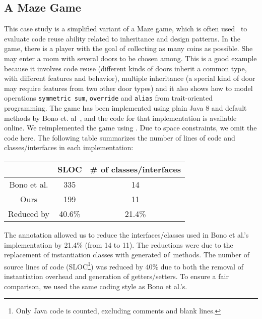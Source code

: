 
\subsection{A Maze Game}
This case study is a simplified variant of a Maze game, which is often
used~\cite{gof,bono14}
to evaluate code reuse ability related to inheritance and design
patterns. In the game, there is a player with the goal of collecting
as many coins as possible. She may enter a room with several doors to
be chosen among. This is a good example because it involves code reuse
(different kinds of doors inherit a common type, with different
features and behavior), multiple inheritance (a special kind of door
may require features from two other door types) and it also shows how
to model operations \texttt{symmetric sum}, \texttt{override} and
\texttt{alias} from trait-oriented programming. The game has been
implemented using plain Java 8 and default methods by Bono
et. al~\cite{bono14}, and the code for that implementation is
available online. We reimplemented the game using \mixin. Due to space
constraints, we omit the code here. The following table summarizes
the number of lines of code and classes/interfaces in each implementation:

\vspace{5pt}
\begin{tabular}{ccc}
\hline \rowcolor[HTML]{C0C0C0}
            & SLOC   & \# of classes/interfaces \\ \hline
Bono et al. & 335    & 14                       \\
Ours        & 199    & 11                       \\
\rowcolor[HTML]{C0C0C0}
Reduced by  & 40.6\% & 21.4\%                   \\ \hline
\end{tabular}
\vspace{5pt}

\noindent The \mixin annotation allowed us to reduce the interfaces/classes used
in Bono et al.'s implementation by 21.4\% (from 14 to 11). The
reductions were due to the replacement of instantiation classes with
generated \texttt{of} methods. The number of source lines of code 
(SLOC\footnote{Only Java code is counted, excluding comments and blank lines. })
was reduced by 40\% due to both the removal of instantiation overhead and
generation of getters/setters. %
To ensure a fair comparison, we used the same coding style as Bono et al.'s.

